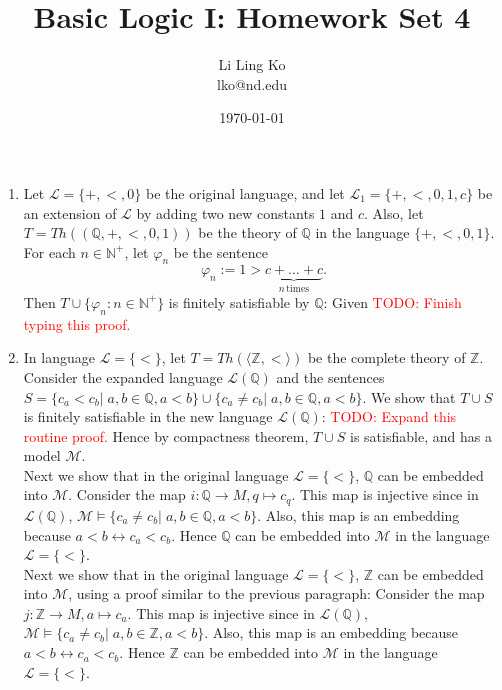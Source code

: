 \documentclass{article}
\newcommand{\TODO}[1]{\textcolor{red}{TODO: #1}}
\begin{document}
\title{Basic Logic I: Homework Set 4}
\author{Li Ling Ko\\ lko@nd.edu}
\date{\today}
\maketitle

\begin{enumerate}
  \item Let $\mathcal{L}=\{+,<,0\}$ be the original language, and let
    $\mathcal{L}_1=\{+,<,0,1,c\}$ be an extension of $\mathcal{L}$ by
    adding two new constants $1$ and $c$. Also, let
    $T=Th((\mathbb{Q},+,<,0,1))$ be the theory of $\mathbb{Q}$ in the
    language $\{+,<,0,1\}$. For each $n\in\mathbb{N}^+$, let $\varphi_n$ be
    the sentence 
    \begin{equation*}
      \varphi_n := 1 > \underbrace{c+\ldots+c}_{n\,\text{times}}.
    \end{equation*}
    Then $T\cup\{\varphi_n:n\in\mathbb{N}^+\}$ is finitely satisfiable by
    $\mathbb{Q}$: Given \TODO{Finish typing this proof.}

  \item In language $\mathcal{L}=\{<\}$, let
    $T=Th(\langle\mathbb{Z},<\rangle)$ be the complete theory of
    $\mathbb{Z}$. Consider the expanded language $\mathcal{L}(\mathbb{Q})$
    and the sentences $S=\{c_a<c_b|\; a,b\in\mathbb{Q}, a<b\}\cup\{c_a\neq
    c_b|\; a,b\in\mathbb{Q}, a<b\}$. We show that $T\cup S$ is finitely
    satisfiable in the new language $\mathcal{L}(\mathbb{Q})$: \TODO{Expand
    this routine proof.} Hence by compactness theorem, $T\cup S$ is
    satisfiable, and has a model $\mathcal{M}$. \\

    Next we show that in the original language $\mathcal{L}=\{<\}$,
    $\mathbb{Q}$ can be embedded into $\mathcal{M}$. Consider the map
    $i:\mathbb{Q}\rightarrow M,q\mapsto c_q$. This map is injective since
    in $\mathcal{L}(\mathbb{Q})$, $\mathcal{M}\models \{c_a\neq c_b|\;
    a,b\in\mathbb{Q}, a<b\}$. Also, this map is an embedding because
    $a<b\leftrightarrow c_a<c_b$. Hence $\mathbb{Q}$ can be embedded into
    $\mathcal{M}$ in the language $\mathcal{L}=\{<\}$. \\

    Next we show that in the original language $\mathcal{L}=\{<\}$,
    $\mathbb{Z}$ can be embedded into $\mathcal{M}$, using a proof similar
    to the previous paragraph: Consider the map $j:\mathbb{Z}\rightarrow
    M,a\mapsto c_a$. This map is injective since in
    $\mathcal{L}(\mathbb{Q})$, $\mathcal{M}\models \{c_a\neq c_b|\;
    a,b\in\mathbb{Z}, a<b\}$. Also, this map is an embedding because
    $a<b\leftrightarrow c_a<c_b$. Hence $\mathbb{Z}$ can be embedded into
    $\mathcal{M}$ in the language $\mathcal{L}=\{<\}$. \\


\end{enumerate}
\end{document}
